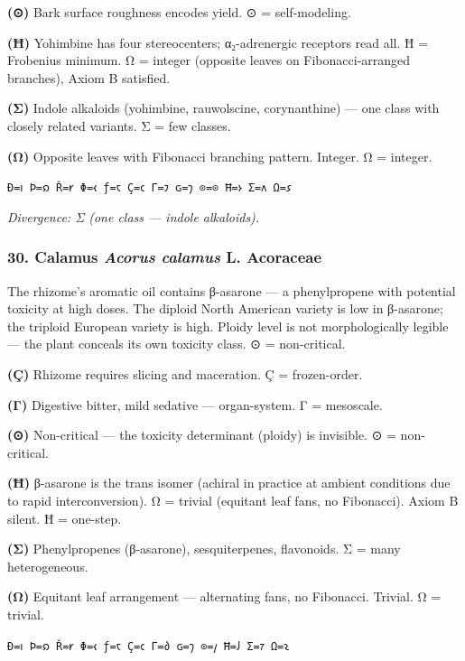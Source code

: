 \textbf{(⊙)} Bark surface roughness encodes yield. ⊙ = self-modeling.

\textbf{(Ħ)} Yohimbine has four stereocenters; α₂-adrenergic receptors
read all. Ħ = Frobenius minimum. Ω = integer (opposite leaves on
Fibonacci-arranged branches), Axiom B satisfied.

\textbf{(Σ)} Indole alkaloids (yohimbine, rauwolscine, corynanthine) ---
one class with closely related variants. Σ = few classes.

\textbf{(Ω)} Opposite leaves with Fibonacci branching pattern. Integer.
Ω = integer.

\texttt{Ð=𐑦\ Þ=𐑸\ Ř=𐑾\ Φ=𐑬\ ƒ=𐑱\ Ç=𐑤\ Γ=𐑲\ ɢ=𐑠\ ⊙=⊙\ Ħ=𐑶\ Σ=𐑵\ Ω=𐑭}

\emph{Divergence: Σ (one class --- indole alkaloids).}

\hypertarget{calamus-acorus-calamus-l.-acoraceae}{%
\subsubsection{\texorpdfstring{30. Calamus \textbar{} \emph{Acorus
calamus} L. \textbar{}
Acoraceae}{30. Calamus \textbar{} Acorus calamus L. \textbar{} Acoraceae}}\label{calamus-acorus-calamus-l.-acoraceae}}

The rhizome's aromatic oil contains β-asarone --- a phenylpropene with
potential toxicity at high doses. The diploid North American variety is
low in β-asarone; the triploid European variety is high. Ploidy level is
not morphologically legible --- the plant conceals its own toxicity
class. ⊙ = non-critical.

\textbf{(Ç)} Rhizome requires slicing and maceration. Ç = frozen-order.

\textbf{(Γ)} Digestive bitter, mild sedative --- organ-system. Γ =
mesoscale.

\textbf{(⊙)} Non-critical --- the toxicity determinant (ploidy) is
invisible. ⊙ = non-critical.

\textbf{(Ħ)} β-asarone is the trans isomer (achiral in practice at
ambient conditions due to rapid interconversion). Ω = trivial (equitant
leaf fans, no Fibonacci). Axiom B silent. Ħ = one-step.

\textbf{(Σ)} Phenylpropenes (β-asarone), sesquiterpenes, flavonoids. Σ =
many heterogeneous.

\textbf{(Ω)} Equitant leaf arrangement --- alternating fans, no
Fibonacci. Trivial. Ω = trivial.

\texttt{Ð=𐑦\ Þ=𐑸\ Ř=𐑾\ Φ=𐑬\ ƒ=𐑱\ Ç=𐑤\ Γ=𐑔\ ɢ=𐑠\ ⊙=𐑢\ Ħ=𐑓\ Σ=𐑳\ Ω=𐑷}

